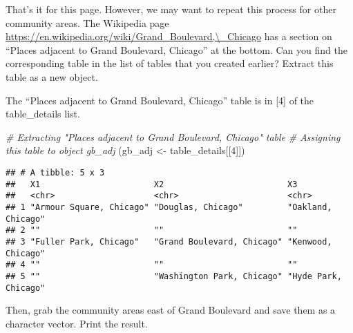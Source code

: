 \documentclass[
]{article}
\newenvironment{Shaded}{\begin{snugshade}}{\end{snugshade}}
\newcommand{\CommentTok}[1]{\textcolor[rgb]{0.56,0.35,0.01}{\textit{#1}}}
\newcommand{\DecValTok}[1]{\textcolor[rgb]{0.00,0.00,0.81}{#1}}
\newcommand{\FunctionTok}[1]{\textcolor[rgb]{0.13,0.29,0.53}{\textbf{#1}}}
\newcommand{\NormalTok}[1]{#1}
\newcommand{\OtherTok}[1]{\textcolor[rgb]{0.56,0.35,0.01}{#1}}
\newcommand{\SpecialCharTok}[1]{\textcolor[rgb]{0.81,0.36,0.00}{\textbf{#1}}}
\begin{document}
That's it for this page. However, we may want to repeat this process for
other community areas. The Wikipedia page
\href{https://en.wikipedia.org/wiki/Grand_Boulevard,_Chicago}{https://en.wikipedia.org/wiki/Grand\_Boulevard,\textbackslash\_Chicago}
has a section on ``Places adjacent to Grand Boulevard, Chicago'' at the
bottom. Can you find the corresponding table in the list of tables that
you created earlier? Extract this table as a new object.

The ``Places adjacent to Grand Boulevard, Chicago'' table is in {[}4{]}
of the table\_details list.

\begin{Shaded}
\begin{Highlighting}[]
\CommentTok{\# Extracting "Places adjacent to Grand Boulevard, Chicago" table}
\CommentTok{\# Assigning this table to object gb\_adj}
\NormalTok{(gb\_adj }\OtherTok{\textless{}{-}}\NormalTok{ table\_details[[}\DecValTok{4}\NormalTok{]])}
\end{Highlighting}
\end{Shaded}

\begin{verbatim}
## # A tibble: 5 x 3
##   X1                       X2                         X3                  
##   <chr>                    <chr>                      <chr>               
## 1 "Armour Square, Chicago" "Douglas, Chicago"         "Oakland, Chicago"  
## 2 ""                       ""                         ""                  
## 3 "Fuller Park, Chicago"   "Grand Boulevard, Chicago" "Kenwood, Chicago"  
## 4 ""                       ""                         ""                  
## 5 ""                       "Washington Park, Chicago" "Hyde Park, Chicago"
\end{verbatim}

Then, grab the community areas east of Grand Boulevard and save them as
a character vector. Print the result.

\begin{Shaded}
\end{Shaded}
\end{document}
